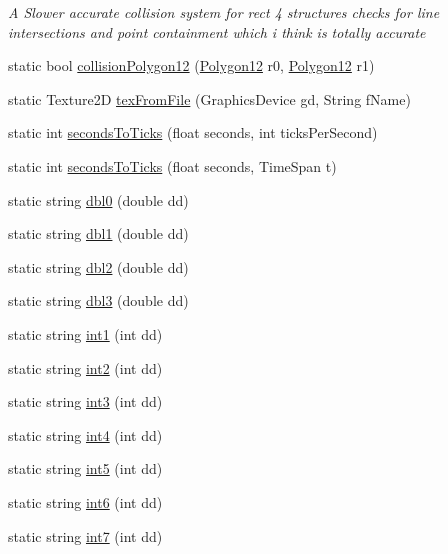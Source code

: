 \begin{DoxyCompactItemize}
\begin{DoxyCompactList}\small\item\em A Slower accurate collision system for rect 4 structures checks for line intersections and point containment which i think is totally accurate \end{DoxyCompactList}\item 
static bool \mbox{\hyperlink{class_r_c___framework_1_1_util_ae49f540d59a1b7169b659a8cd45cffd4}{collision\+Polygon12}} (\mbox{\hyperlink{class_r_c___framework_1_1_polygon12}{Polygon12}} r0, \mbox{\hyperlink{class_r_c___framework_1_1_polygon12}{Polygon12}} r1)
\item 
static Texture2D \mbox{\hyperlink{class_r_c___framework_1_1_util_a407242341a419220c4ee196f2553d04a}{tex\+From\+File}} (Graphics\+Device gd, String f\+Name)
\item 
static int \mbox{\hyperlink{class_r_c___framework_1_1_util_a432029bd0c2fd330b086e0b62d4afeb4}{seconds\+To\+Ticks}} (float seconds, int ticks\+Per\+Second)
\item 
static int \mbox{\hyperlink{class_r_c___framework_1_1_util_acc409dafdb1c4fe02554266da165a9f0}{seconds\+To\+Ticks}} (float seconds, Time\+Span t)
\item 
static string \mbox{\hyperlink{class_r_c___framework_1_1_util_adccf855c375478f646f22a9bef9ac54b}{dbl0}} (double dd)
\item 
static string \mbox{\hyperlink{class_r_c___framework_1_1_util_abef5974ce6f3a15f8066d2d19f63e3eb}{dbl1}} (double dd)
\item 
static string \mbox{\hyperlink{class_r_c___framework_1_1_util_a7dd17e2815d9e71d8b42e42d452cdef8}{dbl2}} (double dd)
\item 
static string \mbox{\hyperlink{class_r_c___framework_1_1_util_a66a7877a79e9575332dc10fca26426f5}{dbl3}} (double dd)
\item 
static string \mbox{\hyperlink{class_r_c___framework_1_1_util_ace78f374f6aa9bb6b6ff33eecc199199}{int1}} (int dd)
\item 
static string \mbox{\hyperlink{class_r_c___framework_1_1_util_ab4098f3fc98178eec79615fd96c8a5a7}{int2}} (int dd)
\item 
static string \mbox{\hyperlink{class_r_c___framework_1_1_util_ad21b9868a5f3b821b63d832fa207580c}{int3}} (int dd)
\item 
static string \mbox{\hyperlink{class_r_c___framework_1_1_util_a572eaef37e4be463a3ae9bb34ff6241f}{int4}} (int dd)
\item 
static string \mbox{\hyperlink{class_r_c___framework_1_1_util_a999f61fae876b3c8241ad49deeb7fc4f}{int5}} (int dd)
\item 
static string \mbox{\hyperlink{class_r_c___framework_1_1_util_a5c4d63b7d4eaf32cda361fb8973cef05}{int6}} (int dd)
\item 
static string \mbox{\hyperlink{class_r_c___framework_1_1_util_ab2f2d7143a68278d2d3754b5a00bc1e3}{int7}} (int dd)
\end{DoxyCompactItemize}
